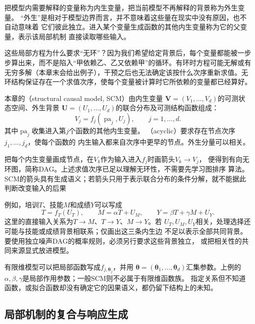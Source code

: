 把模型内需要解释的变量称为内生变量，把当前模型不再解释的背景称为外生变量。
“外生”是相对于模型边界而言，并不意味着这些量在现实中没有原因，也不自动意味着
它们彼此独立。进入某个变量生成函数的其他内生变量称为它的父变量，表示该局部机制
直接读取哪些输入。

这些局部方程为什么要求“无环”？因为我们希望给定背景后，每个变量都能被一步步算出来，而不是陷入“甲依赖乙、乙又依赖甲”的循环。有环时方程可能无解或有无穷多解（本章末会给出例子），干预之后也无法确定该按什么次序重新求值。无环结构保证存在一个求值次序，使每个变量被计算时它所依赖的变量都已经算好。
\begin{definition}[无环结构因果模型]
  \label{def:causal-structural-model}
  本章的（structural causal model, SCM）由内生变量
  \(\bm V=(V_1,\ldots,V_d)\)的可测状态空间、外生背景
  \(\bm U=(U_1,\ldots,U_d)\)的联合分布及可测结构函数组成：
  \begin{equation}
    V_j=f_j(\operatorname{pa}_j,U_j),
    \qquad j=1,\ldots,d.
    \label{eq:causal-scm-definition}
  \end{equation}
  其中\(\operatorname{pa}_j\)收集进入第\(j\)个函数的其他内生变量。
  （acyclic）要求存在节点次序\(j_1,\ldots,j_d\)，使每个函数的
  内生输入都来自次序中更早的节点。外生分量可以相关。
\end{definition}

把每个内生变量画成节点，在\(V_k\)作为输入进入\(f_j\)时画箭头\(V_k\to V_j\)，
便得到有向无环图，简称DAG。上述求值次序已足以理解无环性，不需要先学习图排序
算法。SCM的箭头具有生成语义；若箭头只用于表示联合分布的条件分解，就不能据此
判断改变输入的后果

例如，培训\(T\)、技能\(M\)和成绩\(Y\)可以写成
\[
  T=f_T(U_T),\qquad
  M=\alpha T+U_M,\qquad
  Y=\beta T+\gamma M+U_Y.
\]
这里的直接输入关系为\(T\to M\)、\(T\to Y\)、\(M\to Y\)。若
\(U_T,U_M,U_Y\)相关，处理选择还可能与技能或成绩背景相联系；仅画出这三条内生边
不足以表示全部共同背景。要使用独立噪声DAG的概率规则，必须另行要求这些背景独立，
或把相关性的共同来源显式放进模型。

有限维模型可以把局部函数写成\(f_{j,\bm\theta_j}\)，并用
\(\bm\theta=(\bm\theta_1,\ldots,\bm\theta_d)\)汇集参数。上例的
\(\alpha,\beta,\gamma\)是局部作用参数；一般SCM则不必属于有限维函数族。
指定关系但不知道函数，或拟合函数却没有确定它的因果语义，都仍留下结构上的未知。

\subsection{局部机制的复合与响应生成}
\label{sec:causal-mechanism-composition}

